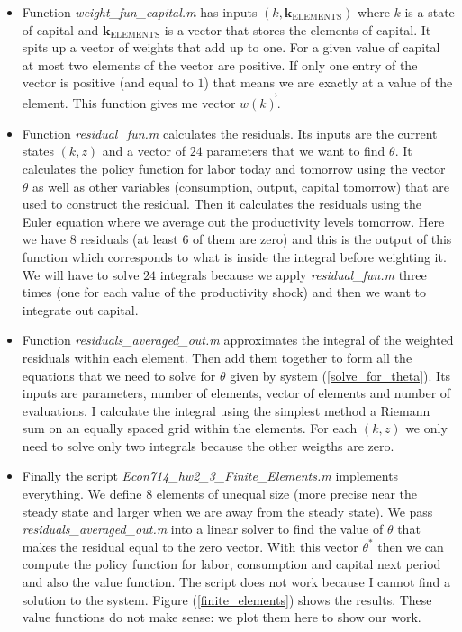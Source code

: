 \documentclass[a4paper,12pt]{article}
\begin{document}
   \begin{itemize}
    
        \item Function \textit{weight\_fun\_capital.m} has inputs $(k, \mathbf{k}_{\text{ELEMENTS}})$ where $k$ is a state of capital and $\mathbf{k}_{\text{ELEMENTS}}$ is a vector that stores the elements of capital. It spits up a vector of weights that add up to one. For a given value of capital at most two elements of the vector are positive. If only one entry of the vector is positive (and equal to $1$) that means we are exactly at a value of the element. This function gives me vector $\vec{w(k)}$. 
        
        \item Function \textit{residual\_fun.m} calculates the residuals. Its inputs are the current states $(k,z)$ and a vector of $24$ parameters that we want to find $\theta$. It calculates the policy function for labor today and tomorrow using the vector $\theta$ as well as other variables (consumption, output, capital tomorrow) that are used to construct the residual. Then it calculates the residuals using the Euler equation where we average out the productivity levels tomorrow. Here we have $8$ residuals (at least $6$ of them are zero) and this is the output of this function which corresponds to what is inside the integral before weighting it. We will have to solve $24$ integrals because we apply \textit{residual\_fun.m} three times (one for each value of the productivity shock) and then we want to integrate out capital. 
        
        \item Function \textit{residuals\_averaged\_out.m} approximates the integral of the weighted residuals within each element. Then add them together to form all the equations that we need to solve for $\theta$ given by system (\ref{solve_for_theta}). Its inputs are parameters, number of elements, vector of elements and number of evaluations. I calculate the integral using the simplest method a Riemann sum on an equally spaced grid within the elements. For each $(k,z)$ we only need to solve only two integrals because the other weigths are zero. 
        
        \item \sloppy Finally the script \textit{Econ714\_hw2\_3\_Finite\_Elements.m} implements everything. We define $8$ elements of unequal size (more precise near the steady state and larger when we are away from the steady state). We pass \textit{residuals\_averaged\_out.m} into a linear solver to find the value of $\theta$ that makes the residual equal to the zero vector. With this vector $\theta^*$ then we can compute the policy function for labor, consumption and capital next period and also the value function. The script does not work because I cannot find a solution to the system. Figure (\ref{finite_elements}) shows the results. These value functions do not make sense: we plot them here to show our work. 
   \end{itemize}
   
\end{document}
